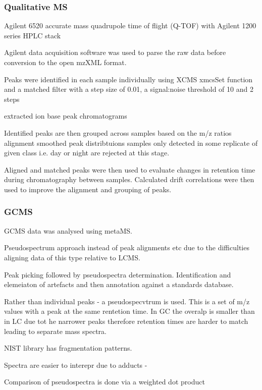 \subsubsection{Qualitative MS}

Agilent 6520 accurate mass quadrupole time of flight (Q-TOF) 
with Agilent 1200 series HPLC stack

Agilent data acquisition software was used to parse the raw data
before conversion to the open mzXML format. 

Peaks were identified in each sample individually using XCMS xmcsSet
function and a matched filter with a step size of 0.01, a signal:noise threshold
of 10 and 2 steps 

extracted ion base peak chromatograms


Identified peaks are then grouped across samples based on the m/z ratios
alignment
smoothed peak distribtuions 
samples only detected in some replicate of given class i.e. day or night 
are rejected at this stage.


Aligned and matched peaks were then used to evaluate changes in retention time during
chromatography between samples.  Calculated drift correlations were then used to
improve the alignment and grouping of peaks.




\subsubsection{GCMS}

GCMS data was analysed using metaMS.

Pseudospectrum approach instead of peak alignments etc due to the difficulties
aligning data of this type relative to LCMS.

Peak picking followed by pseudospectra determination.
Identification and elemeiaton of artefacts and then annotation
against a standards database. 

Rather than individual peaks - a pseudospecvtrum is used.
This is a set of m/z values with a peak at the same rentetion time.
In GC the overalp is smaller than in LC due tot he narrower peaks therefore
retention times are harder to match leading to separate mass spectra. 

NIST library has fragmentation patterns.

Spectra are easier to interepr due to adducts - 



Comparison of pseudospectra is done via a weighted dot product



